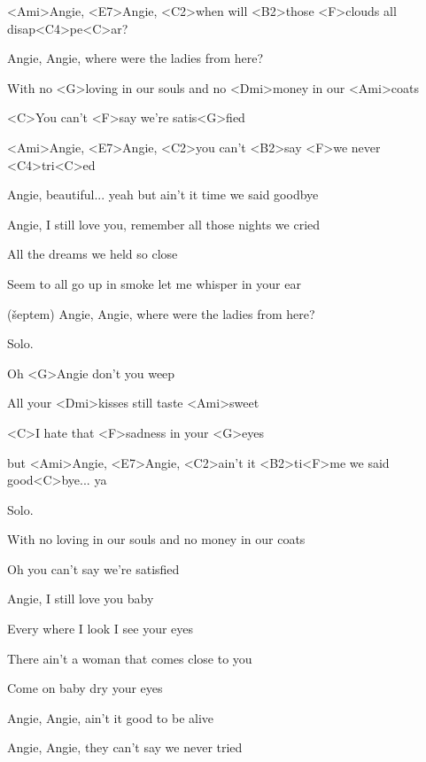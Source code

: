 

\zs
<Ami>Angie, <E7>Angie, <C2>when will <B2>those <F>clouds all disap<C4>pe<C>ar?

Angie, Angie, where were the ladies from here?
\ks

\zr
With no <G>loving in our souls and no <Dmi>money in our <Ami>coats

<C>You can't <F>say we're satis<G>fied

<Ami>Angie, <E7>Angie, <C2>you can't <B2>say <F>we never <C4>tri<C>ed
\kr

\zs
Angie, beautiful... yeah but ain't it time we said goodbye

Angie, I still love you, remember all those nights we cried
\ks

\zr
All the dreams we held so close

Seem to all go up in smoke let me whisper in your ear

(šeptem) Angie, Angie, where were the ladies from here?
\kr

Solo.

\zr
Oh <G>Angie don't you weep

All your <Dmi>kisses still taste <Ami>sweet

<C>I hate that <F>sadness in your <G>eyes

but <Ami>Angie, <E7>Angie, <C2>ain't it <B2>ti<F>me we said good<C>bye... ya
\kr

Solo.

\zr
With no {loving} in our souls
and no {money} in our {coats}

{Oh} you can't {say} we're satisfied
\kr

\zs
Angie, I still love you baby

Every where I look I see your eyes
\ks

\zs
{There} ain't a woman that comes {close} to you

{Come} on {baby} dry your {eyes}

Angie, {Angie,} {ain't} it {good} to be alive

Angie, Angie, they can't say we never tried
\ks

\kp





